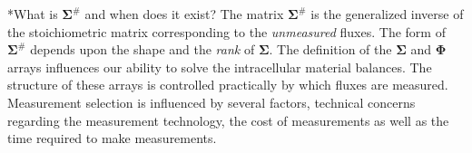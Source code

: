 \documentclass[11pt]{article}
\makeatletter
\theoremstyle{definition}
\renewcommand\subsubsection{\@startsection
	{subsubsection}{2}{0mm}
	{-0.05in}
	{-0.5\baselineskip}
	{\normalfont\normalsize\itshape}}
\makeatother
\begin{document}
\subsubsection*{What is $\mathbf{\Sigma}^{\#}$ and when does it exist?}
The matrix $\mathbf{\Sigma}^{\#}$ is the generalized inverse of the stoichiometric matrix corresponding to the \emph{unmeasured} fluxes. The form of $\mathbf{\Sigma}^{\#}$ depends
upon the shape and the \emph{rank} of $\mathbf{\Sigma}$.
The definition of the $\mathbf{\Sigma}$ and $\mathbf{\Phi}$ arrays influences our ability to solve the intracellular material balances. The structure of these arrays
is controlled practically by which fluxes are measured. Measurement selection is influenced by several factors, technical concerns regarding the measurement
technology, the cost of measurements as well as the time required to make measurements.
\end{document}
